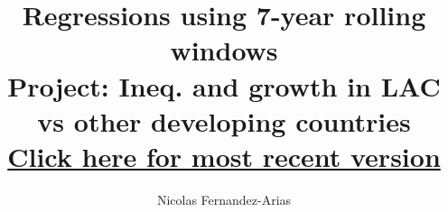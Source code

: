 \documentclass[12pt,english]{article}
\theoremstyle{remark}
\begin{document}
	
	\title{Regressions using 7-year rolling windows \\ \small Project: Ineq. and growth in LAC vs other developing countries \\ \href{.}{Click here for most recent version}}
	\author{Nicolas Fernandez-Arias}
	\maketitle









\footnotesize 



\footnotesize

\normalsize

\footnotesize

\normalsize

\footnotesize

\normalsize

\scriptsize

\scriptsize

\scriptsize

\scriptsize

















\end{document}
